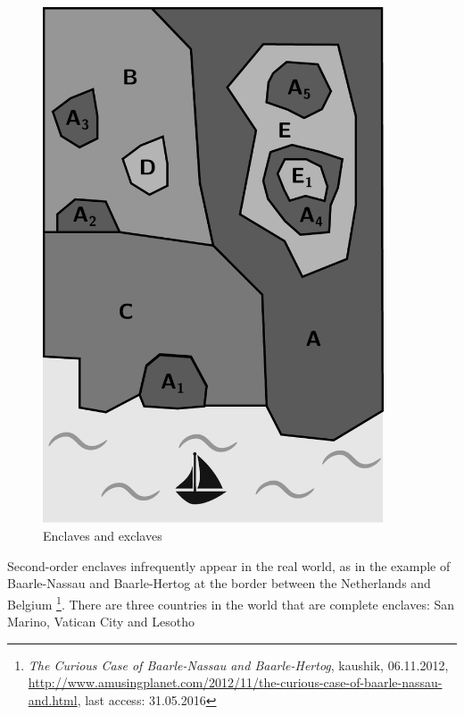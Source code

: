 \begin{minipage}[t]{0.35\textwidth}

\vspace{-2em}
\begin{figure}[H]
  \centering
  \includegraphics[width=0.9\textwidth]{graphics/basics/countries/enclaves_exclaves}
  \caption{Enclaves and exclaves \protect\footnotemark}
  \label{fig:enclaves_exclaves}
\end{figure}

\end{minipage}    %


Second-order enclaves infrequently appear in the real world, as in the example of Baarle-Nassau and Baarle-Hertog at the border between the Netherlands and Belgium
\footnote{
  \emph{The Curious Case of Baarle-Nassau and Baarle-Hertog},
  kaushik, 06.11.2012,
  \url{http://www.amusingplanet.com/2012/11/the-curious-case-of-baarle-nassau-and.html},
  last access: 31.05.2016
}.
There are three countries in the world that are complete enclaves: San Marino, Vatican City and Lesotho

